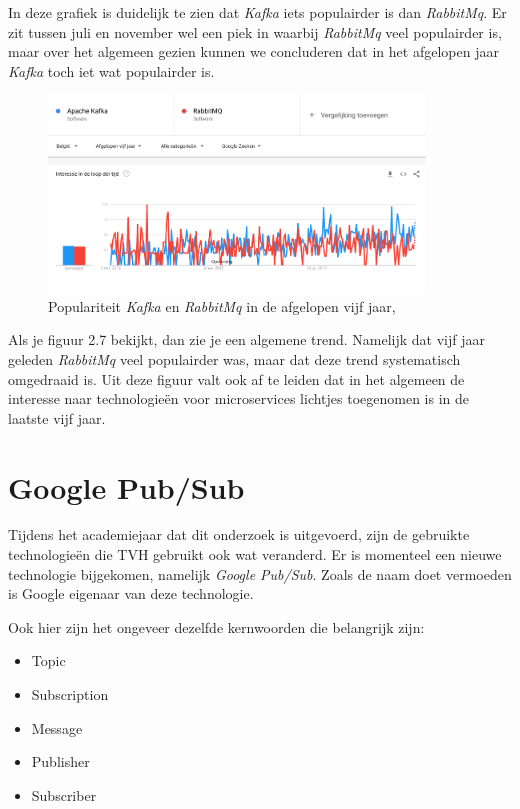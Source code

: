 In deze grafiek is duidelijk te zien dat \emph{Kafka} iets populairder is dan \emph{RabbitMq}. Er zit tussen juli en november wel een piek in waarbij \emph{RabbitMq} veel populairder is, maar over het algemeen gezien kunnen we concluderen dat in het afgelopen jaar \emph{Kafka} toch iet wat populairder is.

 \begin{figure}[h!]
    \centering
    \includegraphics[width=100mm]{../KvsRMQ2.png}
    \caption{Populariteit \emph{Kafka} en \emph{RabbitMq} in de afgelopen vijf jaar, \autocite{Trends2019}}
    
\end{figure}

Als je figuur 2.7 bekijkt, dan zie je een algemene trend. Namelijk dat vijf jaar geleden \emph{RabbitMq} veel populairder was, maar dat deze trend systematisch omgedraaid is. Uit deze figuur valt ook af te leiden dat in het algemeen de interesse naar technologieën voor microservices lichtjes toegenomen is in de laatste vijf jaar.

\autocite{Trends2019}

\section{Google Pub/Sub}
Tijdens het academiejaar dat dit onderzoek is uitgevoerd, zijn de gebruikte technologieën die TVH gebruikt ook wat veranderd. Er is momenteel een nieuwe technologie bijgekomen, namelijk \emph{Google Pub/Sub}. Zoals de naam doet vermoeden is Google eigenaar van deze technologie. 

Ook hier zijn het ongeveer dezelfde kernwoorden die belangrijk zijn:
\begin{itemize}
    \item Topic
    \item Subscription
    \item Message
    \item Publisher
    \item Subscriber
\end{itemize}

